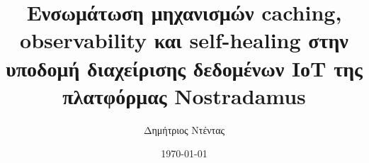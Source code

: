 \documentclass[a4paper,12 pt,oneside]{report}
\title{Ενσωμάτωση μηχανισμών caching,
observability και self-healing στην υποδομή διαχείρισης
δεδομένων ΙοΤ της πλατφόρμας Nostradamus}
\author{Δημήτριος Ντέντας}
\date{\today}
\begin{document}
\sloppy

\maketitle
\tableofcontents

% 

\newevenside
{}



% 
% 

\newevenside
\renewcommand{\bibname}{Βιβλιογραφία}

\end{document}
